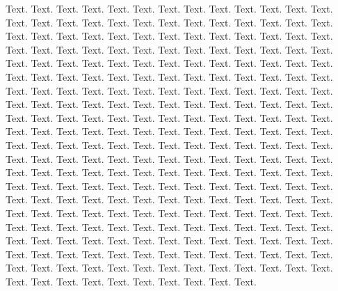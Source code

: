 \documentclass{article}
\begin{document}
\begin{multicols}{2}
Text. Text. Text. Text. Text. Text. Text. Text. Text. Text. Text. Text. Text. Text. Text.
Text. Text. Text. Text. Text. Text. Text. Text. Text. Text. Text. Text. Text. Text. Text.
Text. Text. Text. Text. Text. Text. Text. Text. Text. Text. Text. Text. Text. Text. Text.
Text. Text. Text. Text. Text. Text. Text. Text. Text. Text. Text. Text. Text. Text. Text.
Text. Text. Text. Text. Text. Text. Text. Text. Text. Text. Text. Text. Text. Text. Text.
Text. Text. Text. Text. Text. Text. Text. Text. Text. Text. Text. Text. Text. Text. Text.
Text. Text. Text. Text. Text. Text. Text. Text. Text. Text. Text. Text. Text. Text. Text.
Text. Text. Text. Text. Text. Text. Text. Text. Text. Text. Text. Text. Text. Text. Text.
Text. Text. Text. Text. Text. Text. Text. Text. Text. Text. Text. Text. Text. Text. Text.
Text. Text. Text. Text. Text. Text. Text. Text. Text. Text. Text. Text. Text. Text. Text.
Text. Text. Text. Text. Text. Text. Text. Text. Text. Text. Text. Text. Text. Text. Text.
Text. Text. Text. Text. Text. Text. Text. Text. Text. Text. Text. Text. Text. Text. Text.
Text. Text. Text. Text. Text. Text. Text. Text. Text. Text. Text. Text. Text. Text. Text.
Text. Text. Text. Text. Text. Text. Text. Text. Text. Text. Text. Text. Text. Text. Text.
Text. Text. Text. Text. Text. Text. Text. Text. Text. Text. Text. Text. Text. Text. Text.
Text. Text. Text. Text. Text. Text. Text. Text. Text. Text. Text. Text. Text. Text. Text.
Text. Text. Text. Text. Text. Text. Text. Text. Text. Text. Text. Text. Text. Text. Text.
Text. Text. Text. Text. Text. Text. Text. Text. Text. Text. Text. Text. Text. Text. Text.
\end{multicols}
\end{document}
